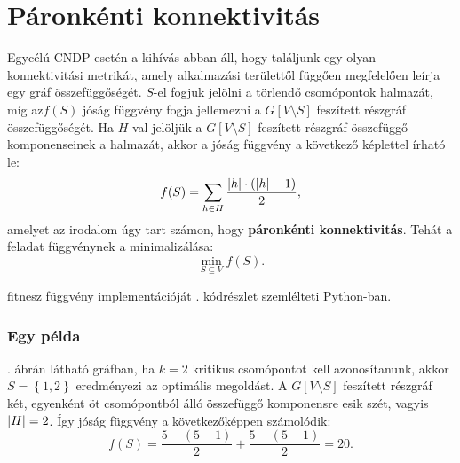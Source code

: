 \section{Páronkénti konnektivitás}\label{sec:PAIRWISE_CONNECTIVITY}
Egycélú CNDP esetén a kihívás abban áll, hogy találjunk egy olyan konnektivitási metrikát,
amely alkalmazási területtől függően megfelelően leírja egy gráf összefüggőségét.
$S$-el fogjuk jelölni a törlendő csomópontok halmazát,
míg az$f(S)$ jóság függvény fogja jellemezni a $G[V \setminus S]$ feszített részgráf összefüggőségét.
Ha $H$-val jelöljük a $G[V \setminus S]$ feszített részgráf összefüggő komponenseinek a halmazát,
akkor a jóság függvény a következő képlettel írható le:
\begin{equation}\label{eqn:PAIRWISE_CONNECTIVITY}
  f(S) = \sum_{h \in H} \frac{\lvert h\rvert \cdot (\lvert h\rvert - 1)}{2},
\end{equation}
amelyet az irodalom \cite{ventresca2012global, aringhieri2016general} úgy tart számon,
hogy \textbf{páronkénti konnektivitás}.
Tehát a feladat  függvénynek a minimalizálása:
\begin{equation}\label{eqn:MIN_PAIRWISE_CONNECTIVITY}
  \min_{S \subseteq V} f(S).
\end{equation}

 fitnesz függvény implementációját . kódrészlet szemlélteti Python-ban.



\subsubsection{Egy példa}
. ábrán látható gráfban,
ha $k = 2$ kritikus csomópontot kell azonosítanunk,
akkor $S = \left\{ 1, 2 \right\}$ eredményezi az optimális megoldást.
A $G\left[ V \setminus S \right]$ feszített részgráf két, egyenként öt csomópontból álló összefüggő komponensre esik szét,
vagyis $\lvert H\rvert = 2$. Így  jóság függvény a következőképpen számolódik:
\[
  f(S) = \dfrac{5 - (5 - 1)}{2} + \dfrac{5 - (5 - 1)}{2} = 20.
\]

